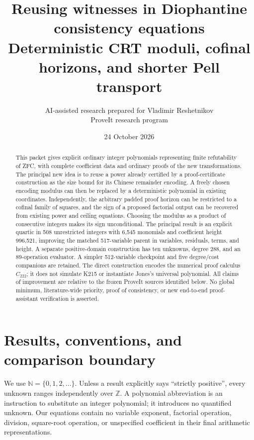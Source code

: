 \documentclass[11pt]{article}
\title{Reusing witnesses in Diophantine consistency equations\\[5pt]\large Deterministic CRT moduli, cofinal horizons, and shorter Pell transport}
\author{AI-assisted research prepared for Vladimir Reshetnikov\\\small ProveIt research program}
\date{24 October 2026}
\newcommand{\Z}{\mathbb Z}\newcommand{\N}{\mathbb N}
\newcommand{\Ccal}{C_{222}}\newcommand{\htop}{\operatorname{ht}}
\theoremstyle{definition}\newtheorem{definition}[theorem]{Definition}
\theoremstyle{remark}\newtheorem{remark}[theorem]{Remark}
\begin{document}
\maketitle
\begin{abstract}
This packet gives explicit ordinary integer polynomials representing finite
refutability of ZFC, with complete coefficient data and ordinary proofs of the
new transformations. The principal new idea is to reuse a power already
certified by a proof-certificate construction as the size bound for its
Chinese remainder encoding. A freely chosen encoding modulus can then be
replaced by a deterministic polynomial in existing coordinates. Independently,
the arbitrary padded proof horizon can be restricted to a cofinal family of
squares, and the sign of a proposed factorial output can be recovered from
existing power and ceiling equations. Choosing the modulus as a product of
consecutive integers makes its sign unconditional. The principal result is an explicit quartic
in 508 unrestricted integers with 6,545 monomials and coefficient height
996,521, improving the matched 517-variable parent in variables, residuals,
terms, and height. A separate positive-domain construction has ten unknowns,
degree 288, and an 89-operation evaluator. A simpler 512-variable checkpoint
and five degree/cost companions are retained. The direct construction
encodes the numerical proof calculus $\Ccal$; it does not simulate K215 or
instantiate Jones's universal polynomial. All claims of improvement are
relative to the frozen ProveIt sources identified below. No global minimum,
literature-wide priority, proof of consistency, or new end-to-end proof-assistant
verification is asserted.
\end{abstract}

\setcounter{tocdepth}{1}
\begingroup
\setlength{\parskip}{0pt}
\small
\tableofcontents
\endgroup
\newpage
\section{Results, conventions, and comparison boundary}
\label{sec:results}

We use $\N=\{0,1,2,\ldots\}$. Unless a result explicitly says
``strictly positive'', every unknown ranges independently over $\Z$.
A polynomial abbreviation is an instruction to substitute an integer
polynomial; it introduces no quantified unknown. Our equations contain no
variable exponent, factorial operation, division, square-root operation, or
unspecified coefficient in their final arithmetic representations.
\end{document}
